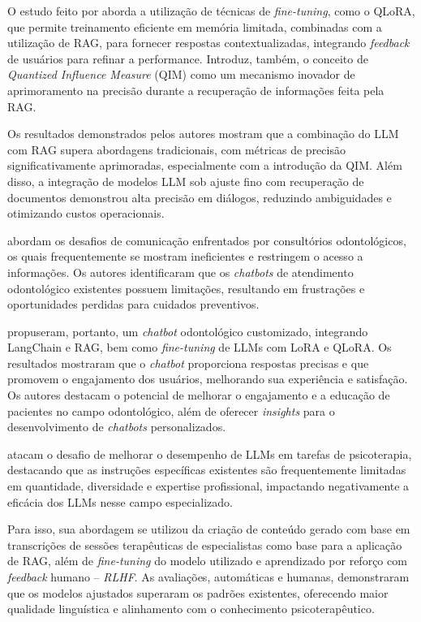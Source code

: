 O estudo feito por  aborda a utilização de técnicas de \textit{fine-tuning}, como o QLoRA, que permite treinamento eficiente em memória limitada, combinadas com a utilização de \ac{RAG}, para fornecer respostas contextualizadas, integrando \textit{feedback} de usuários para refinar a performance. Introduz, também, o conceito de \textit{Quantized Influence Measure} (QIM) como um mecanismo inovador de aprimoramento na precisão durante a recuperação de informações feita pela \ac{RAG}.

Os resultados demonstrados pelos autores mostram que a combinação do \ac{LLM} com \ac{RAG} supera abordagens tradicionais, com métricas de precisão significativamente aprimoradas, especialmente com a introdução da QIM. Além disso, a integração de modelos \ac{LLM} sob ajuste fino com recuperação de documentos demonstrou alta precisão em diálogos, reduzindo ambiguidades e otimizando custos operacionais.

 abordam os desafios de comunicação enfrentados por consultórios odontológicos, os quais frequentemente se mostram ineficientes e restringem o acesso a informações. Os autores identificaram que os \textit{chatbots} de atendimento odontológico existentes possuem limitações, resultando em frustrações e oportunidades perdidas para cuidados preventivos.

 propuseram, portanto, um \textit{chatbot} odontológico customizado, integrando LangChain e \ac{RAG}, bem como \textit{fine-tuning} de \ac{LLM}s com LoRA e QLoRA. Os resultados mostraram que o \textit{chatbot} proporciona respostas precisas e que promovem o engajamento dos usuários, melhorando sua experiência e satisfação. Os autores destacam o potencial de melhorar o engajamento e a educação de pacientes no campo odontológico, além de oferecer \textit{insights} para o desenvolvimento de \textit{chatbots} personalizados.

 atacam o desafio de melhorar o desempenho de \ac{LLM}s em tarefas de psicoterapia, destacando que as instruções específicas existentes são frequentemente limitadas em quantidade, diversidade e expertise profissional, impactando negativamente a eficácia dos \ac{LLM}s nesse campo especializado.

Para isso, sua abordagem se utilizou da criação de conteúdo gerado com base em transcrições de sessões terapêuticas de especialistas como base para a aplicação de \ac{RAG}, além de \textit{fine-tuning} do modelo utilizado e aprendizado por reforço com \textit{feedback} humano -- \textit{\ac{RLHF}}. As avaliações, automáticas e humanas, demonstraram que os modelos ajustados superaram os padrões existentes, oferecendo maior qualidade linguística e alinhamento com o conhecimento psicoterapêutico.


